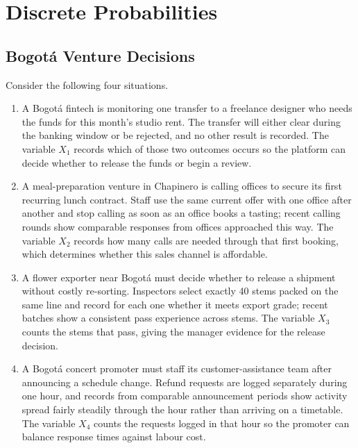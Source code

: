 
	\section{Discrete Probabilities}
	\label{sec:discrete-probabilities}


	\subsection{Bogotá Venture Decisions}
	\label{sec:bogota-venture-decisions}

	Consider the following four situations.

	\begin{enumerate}
		\item A Bogotá fintech is monitoring one transfer to a freelance designer who needs the funds for this month's studio rent. The transfer will either clear during the banking window or be rejected, and no other result is recorded. The variable \(X_1\) records which of those two outcomes occurs so the platform can decide whether to release the funds or begin a review.
		\item A meal-preparation venture in Chapinero is calling offices to secure its first recurring lunch contract. Staff use the same current offer with one office after another and stop calling as soon as an office books a tasting; recent calling rounds show comparable responses from offices approached this way. The variable \(X_2\) records how many calls are needed through that first booking, which determines whether this sales channel is affordable.
		\item A flower exporter near Bogotá must decide whether to release a shipment without costly re-sorting. Inspectors select exactly 40 stems packed on the same line and record for each one whether it meets export grade; recent batches show a consistent pass experience across stems. The variable \(X_3\) counts the stems that pass, giving the manager evidence for the release decision.
		\item A Bogotá concert promoter must staff its customer-assistance team after announcing a schedule change. Refund requests are logged separately during one hour, and records from comparable announcement periods show activity spread fairly steadily through the hour rather than arriving on a timetable. The variable \(X_4\) counts the requests logged in that hour so the promoter can balance response times against labour cost.
	\end{enumerate}

